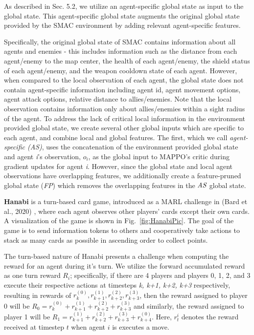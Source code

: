 As described in Sec. 5.2, we utilize an agent-specific global state as input to the global state. This agent-specific global state augments the original global state provided by the SMAC environment by adding relevant agent-specific features. 

Specifically, the original global state of SMAC contains information about all agents and enemies - this includes information such as the distance from each agent/enemy to the map center, the health of each agent/enemy, the shield status of each agent/enemy, and the weapon cooldown state of each agent. However, when compared to the local observation of each agent, the global state does not contain agent-specific information including agent id, agent movement options, agent attack options, relative distance to allies/enemies. Note that the local observation contains information only about allies/enemies within a sight radius of the agent. To address the lack of critical local information in the environment provided global state, we create several other global inputs which are specific to each agent, and combine local and global features. The first, which we call \emph{agent-specific (AS)}, uses the concatenation of the environment provided global state and agent \emph{i}'s observation, $o_i$, as the global input to MAPPO's critic during gradient updates for agent \emph{i}. However, since the global state and local agent observations have overlapping features, we additionally create a feature-pruned global state (\emph{FP}) which removes the overlapping features in the $\emph{AS}$ global state. 

\textbf{Hanabi} is a turn-based card game, introduced as a MARL challenge in (Bard et al., 2020) 
, where each agent observes other players' cards except their own cards. A visualization of the game is shown in Fig.~\ref{fig:HanabiPic}. The goal of the game is to send information tokens to others and cooperatively take actions to stack as many cards as possible in ascending order to collect points.

The turn-based nature of Hanabi presents a challenge when computing the reward for an agent during it's turn. We utilize the forward accumulated reward as one turn reward $R_i$; specifically, if there are 4 players and players 0, 1, 2, and 3 execute their respective actions at timesteps \textit{k, k+1, k+2, k+3} respectively, resulting in rewards of $r_k^{(0)}, r_{k+1}^{(1)}, r_{k+2}^{(2)}, r_{k+3}^{(3)}$, then the reward assigned to player 0 will be $R_0 = r_k^{(0)} + r_{k+1}^{(1)} + r_{k+2}^{(2)} + r_{k+3}^{(3)}$ and similarly, the reward assigned to player 1 will be $R_1 = r_{k+1}^{(1)} + r_{k+2}^{(2)} + r_{k+3}^{(3)} + r_{k+4}^{(0)}$. Here, $r_{t}^i$ denotes the reward received at timestep $t$ when agent $i$ is executes a move.

